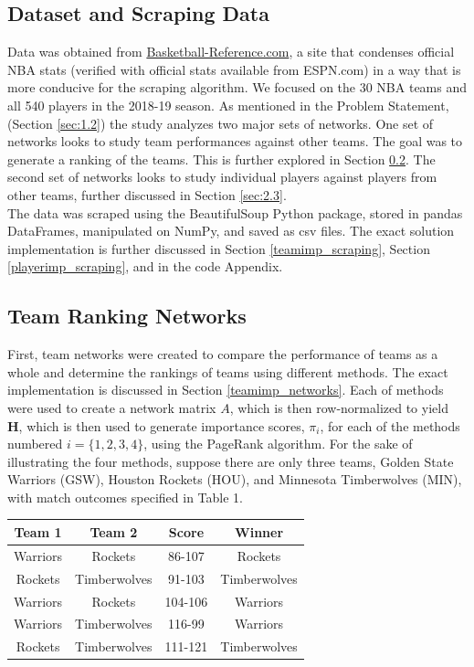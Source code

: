 \documentclass[12pt]{article}%
\begin{document}
\subsection{Dataset and Scraping Data}
\null\quad\quad Data was obtained from \href{https://www.basketball-reference.com/}{Basketball-Reference.com}, a site that condenses official NBA stats (verified with official stats available from ESPN.com) in a way that is more conducive for the scraping algorithm. We focused on the 30 NBA teams and all 540 players in the 2018-19 season. As mentioned in the Problem Statement, (Section \ref{sec:1.2}) the study analyzes two major sets of networks. One set of networks looks to study team performances against other teams. The goal was to generate a ranking of the teams. This is further explored in Section \ref{sec:2.2}. The second set of networks looks to study individual players against players from other teams, further discussed in Section \ref{sec:2.3}. \\
\null\quad\quad The data was scraped using the BeautifulSoup Python package, stored in pandas DataFrames, manipulated on NumPy, and saved as csv files. The exact solution implementation is further discussed in Section \ref{teamimp_scraping}, Section \ref{playerimp_scraping}, and in the code Appendix.
\subsection{Team Ranking Networks}
\label{sec:2.2}
\null\quad\quad First, team networks were created to compare the performance of teams as a whole and determine the rankings of teams using different methods. The exact implementation is discussed in Section \ref{teamimp_networks}. Each of methods were used to create a network matrix $A$, which is then row-normalized to yield \textbf{H}, which is then used to generate importance scores, $\pi_i$, for each of the methods numbered $i=\{1,2,3,4\}$, using the PageRank algorithm. For the sake of illustrating the four methods, suppose there are only three teams, Golden State Warriors (GSW), Houston Rockets (HOU), and Minnesota Timberwolves (MIN), with match outcomes specified in Table 1.
\begin{center}
\begin{tabular}{|c|c|c|c|}
\hline
\textbf{Team 1} & \textbf{Team 2} & \textbf{Score} & \textbf{Winner}\\
\hline
Warriors & Rockets & 86-107 & Rockets\\
Rockets & Timberwolves & 91-103 & Timberwolves\\
Warriors & Rockets & 104-106 & Warriors\\
Warriors & Timberwolves & 116-99 & Warriors\\
Rockets & Timberwolves & 111-121 & Timberwolves\\
\hline
\end{tabular}
\end{center}
\end{document}
